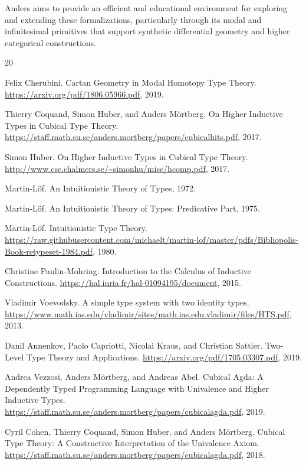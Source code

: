 \documentclass[a4paper,UKenglish,cleveref, autoref, thm-restate]{lipics-v2021}
\begin{document}
Anders aims to provide an efficient and educational environment for exploring and extending these formalizations, particularly through its modal and infinitesimal primitives that support synthetic differential geometry and higher categorical constructions.

\newpage
\begin{thebibliography}{20}

Felix Cherubini.
\newblock Cartan Geometry in Modal Homotopy Type Theory.
\newblock \url{https://arxiv.org/pdf/1806.05966.pdf}, 2019.

Thierry Coquand, Simon Huber, and Anders Mörtberg.
\newblock On Higher Inductive Types in Cubical Type Theory.
\newblock \url{https://staff.math.su.se/anders.mortberg/papers/cubicalhits.pdf}, 2017.

Simon Huber.
\newblock On Higher Inductive Types in Cubical Type Theory.
\newblock \url{http://www.cse.chalmers.se/~simonhu/misc/hcomp.pdf}, 2017.

Martin-Löf.
\newblock An Intuitionistic Theory of Types, 1972.

Martin-Löf.
\newblock An Intuitionistic Theory of Types: Predicative Part, 1975.

Martin-Löf.
\newblock Intuitionistic Type Theory.
\newblock \url{https://raw.githubusercontent.com/michaelt/martin-lof/master/pdfs/Bibliopolis-Book-retypeset-1984.pdf}, 1980.

Christine Paulin-Mohring.
\newblock Introduction to the Calculus of Inductive Constructions.
\newblock \url{https://hal.inria.fr/hal-01094195/document}, 2015.

Vladimir Voevodsky.
\newblock A simple type system with two identity types.
\newblock \url{https://www.math.ias.edu/vladimir/sites/math.ias.edu.vladimir/files/HTS.pdf}, 2013.

Danil Annenkov, Paolo Capriotti, Nicolai Kraus, and Christian Sattler.
\newblock Two-Level Type Theory and Applications.
\newblock \url{https://arxiv.org/pdf/1705.03307.pdf}, 2019.

Andrea Vezzosi, Anders Mörtberg, and Andreas Abel.
\newblock Cubical Agda: A Dependently Typed Programming Language with Univalence and Higher Inductive Types.
\newblock \url{https://staff.math.su.se/anders.mortberg/papers/cubicalagda.pdf}, 2019.

Cyril Cohen, Thierry Coquand, Simon Huber, and Anders Mörtberg.
\newblock Cubical Type Theory: A Constructive Interpretation of the Univalence Axiom.
\newblock \url{https://staff.math.su.se/anders.mortberg/papers/cubicalagda.pdf}, 2018.


\end{thebibliography}
\end{document}
